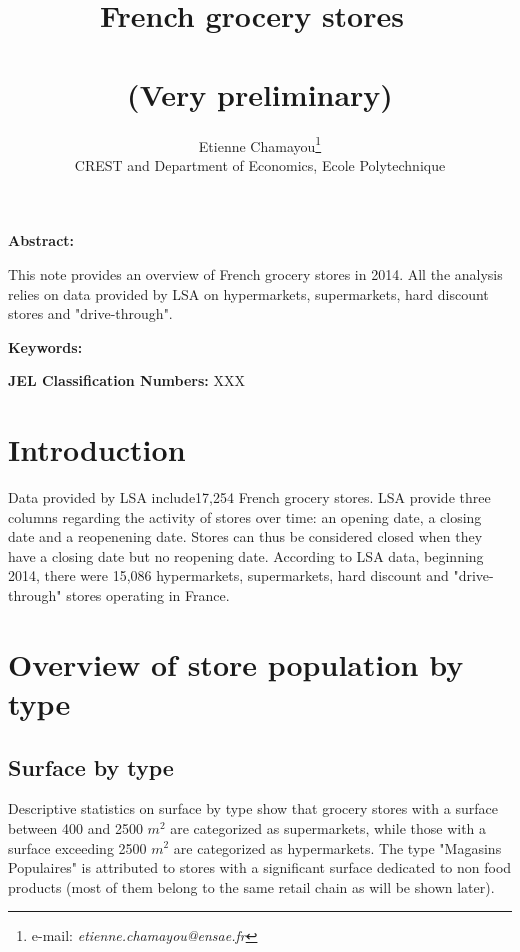 \documentclass[11pt]{article}
\begin{document}
\title{French grocery stores\ \\ \ \\(Very preliminary)}
\author{Etienne Chamayou\thanks{e-mail:
\textit{etienne.chamayou@ensae.fr}}\medskip\\{\normalsize CREST and Department of Economics, Ecole Polytechnique }}
\maketitle

\sloppy%

\onehalfspacing

\textbf{Abstract:}

This note provides an overview of French grocery stores in 2014. All the analysis relies on data provided by LSA on hypermarkets, supermarkets, hard discount stores and "drive-through".

\strut

\textbf{Keywords:} 

\strut

\textbf{JEL Classification Numbers:} XXX

\pagebreak%
\doublespacing

\section{Introduction}

Data provided by LSA include17,254 French grocery stores. LSA provide three columns regarding the activity of stores over time: an opening date, a closing date and a reopenening date. Stores can thus be considered closed when they have a closing date but no reopening date. According to LSA data, beginning 2014, there were 15,086 hypermarkets, supermarkets, hard discount and "drive-through" stores operating in France. 

\section{Overview of store population by type}

\subsection{Surface by type}

Descriptive statistics on surface by type show that grocery stores with a surface between 400 and 2500 $m^2$ are categorized as supermarkets, while those with a surface exceeding 2500 $m^2$ are categorized as hypermarkets. The type "Magasins Populaires" is attributed to stores with a significant surface dedicated to non food products (most of them belong to the same retail chain as will be shown later).
\end{document}
